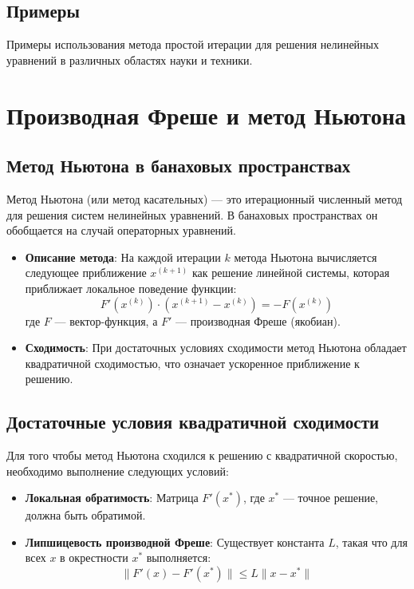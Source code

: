 \documentclass{article}
\begin{document}
\subsection{Примеры}

Примеры использования метода простой итерации для решения нелинейных уравнений в различных областях науки и техники.

\section{Производная Фреше и метод Ньютона}

\subsection{Метод Ньютона в банаховых пространствах}

Метод Ньютона (или метод касательных) — это итерационный численный метод для решения систем нелинейных уравнений. В банаховых пространствах он обобщается на случай операторных уравнений.

\begin{itemize}
  \item \textbf{Описание метода}: На каждой итерации \( k \) метода Ньютона вычисляется следующее приближение \( x^{(k+1)} \) как решение линейной системы, которая приближает локальное поведение функции:
  \[
  F'(x^{(k)}) \cdot (x^{(k+1)} - x^{(k)}) = -F(x^{(k)})
  \]
  где \( F \) — вектор-функция, а \( F' \) — производная Фреше (якобиан).
  
  \item \textbf{Сходимость}: При достаточных условиях сходимости метод Ньютона обладает квадратичной сходимостью, что означает ускоренное приближение к решению.
\end{itemize}

\subsection{Достаточные условия квадратичной сходимости}

Для того чтобы метод Ньютона сходился к решению с квадратичной скоростью, необходимо выполнение следующих условий:

\begin{itemize}
  \item \textbf{Локальная обратимость}: Матрица \( F'(x^{*}) \), где \( x^{*} \) — точное решение, должна быть обратимой.
  \item \textbf{Липшицевость производной Фреше}: Существует константа \( L \), такая что для всех \( x \) в окрестности \( x^{*} \) выполняется:
  \[
  \| F'(x) - F'(x^{*}) \| \leq L \| x - x^{*} \|
  \]
\end{itemize}
\end{document}
